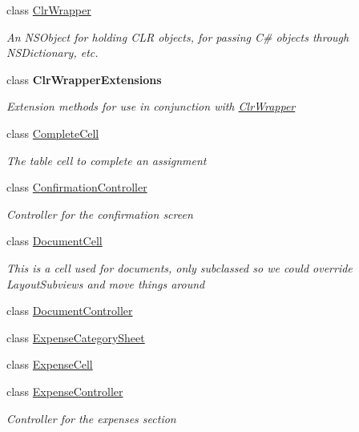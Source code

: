\begin{DoxyCompactItemize}
class \hyperlink{class_field_service_1_1i_o_s_1_1_clr_wrapper}{Clr\+Wrapper}
\begin{DoxyCompactList}\small\item\em An N\+S\+Object for holding C\+L\+R objects, for passing C\# objects through N\+S\+Dictionary, etc. \end{DoxyCompactList}\item 
class {\bfseries Clr\+Wrapper\+Extensions}
\begin{DoxyCompactList}\small\item\em Extension methods for use in conjunction with \hyperlink{class_field_service_1_1i_o_s_1_1_clr_wrapper}{Clr\+Wrapper} \end{DoxyCompactList}\item 
class \hyperlink{class_field_service_1_1i_o_s_1_1_complete_cell}{Complete\+Cell}
\begin{DoxyCompactList}\small\item\em The table cell to complete an assignment \end{DoxyCompactList}\item 
class \hyperlink{class_field_service_1_1i_o_s_1_1_confirmation_controller}{Confirmation\+Controller}
\begin{DoxyCompactList}\small\item\em Controller for the confirmation screen \end{DoxyCompactList}\item 
class \hyperlink{class_field_service_1_1i_o_s_1_1_document_cell}{Document\+Cell}
\begin{DoxyCompactList}\small\item\em This is a cell used for documents, only subclassed so we could override Layout\+Subviews and move things around \end{DoxyCompactList}\item 
class \hyperlink{class_field_service_1_1i_o_s_1_1_document_controller}{Document\+Controller}
\item 
class \hyperlink{class_field_service_1_1i_o_s_1_1_expense_category_sheet}{Expense\+Category\+Sheet}
\item 
class \hyperlink{class_field_service_1_1i_o_s_1_1_expense_cell}{Expense\+Cell}
\item 
class \hyperlink{class_field_service_1_1i_o_s_1_1_expense_controller}{Expense\+Controller}
\begin{DoxyCompactList}\small\item\em Controller for the expenses section \end{DoxyCompactList}\item 

\end{DoxyCompactItemize}
